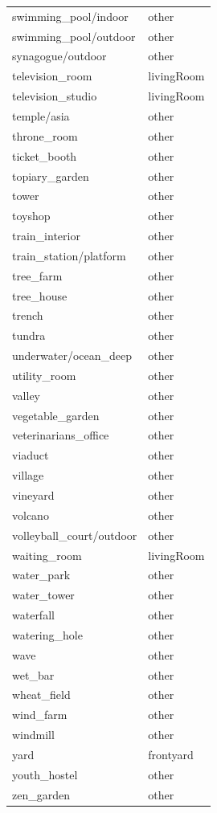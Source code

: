 \begin{table}[h!]
\begin{tabular}{| l | l |}
		swimming\_pool/indoor &        other \\
		swimming\_pool/outdoor &        other \\
		synagogue/outdoor &        other \\
		television\_room &   livingRoom \\
		television\_studio &   livingRoom \\
		temple/asia &        other \\
		throne\_room &        other \\
		ticket\_booth &        other \\
		topiary\_garden &        other \\
		tower &        other \\
		toyshop &        other \\
		train\_interior &        other \\
		train\_station/platform &        other \\
		tree\_farm &        other \\
		tree\_house &        other \\
		trench &        other \\
		tundra &        other \\
		underwater/ocean\_deep &        other \\
		utility\_room &        other \\
		valley &        other \\
		vegetable\_garden &        other \\
		veterinarians\_office &        other \\
		viaduct &        other \\
		village &        other \\
		vineyard &        other \\
		volcano &        other \\
		volleyball\_court/outdoor &        other \\
		waiting\_room &   livingRoom \\
		water\_park &        other \\
		water\_tower &        other \\
		waterfall &        other \\
		watering\_hole &        other \\
		wave &        other \\
		wet\_bar &        other \\
		wheat\_field &        other \\
		wind\_farm &        other \\
		windmill &        other \\
		yard &    frontyard \\
		youth\_hostel &        other \\
		zen\_garden &        other \\
		\bottomrule
	\end{tabular}
	\label{anexo:exp3:mapping}
\end{table}